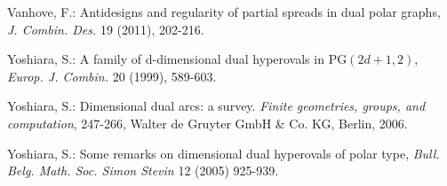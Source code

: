 \documentclass{amsart}
\theoremstyle{plain}
\theoremstyle{definition}
\begin{document}
\begin{thebibliography}{9}
Vanhove, F.: Antidesigns and regularity of partial spreads in dual polar graphs, {\it J. Combin. Des.} 19 (2011), 202-216.

Yoshiara, S.: A family of d-dimensional dual hyperovals in ${\mathrm{PG}}(2d + 1, 2)$, {\it Europ. J. Combin.} 20 (1999), 589-603.

Yoshiara, S.: Dimensional dual arcs: a survey. {\it Finite geometries, groups, and computation}, 247-266, Walter de Gruyter GmbH \& Co. KG, Berlin, 2006.

Yoshiara, S.: Some remarks on dimensional dual hyperovals of polar type, {\it Bull. Belg. Math. Soc. Simon Stevin} 12 (2005) 925-939.

\end{thebibliography}
\end{document}
